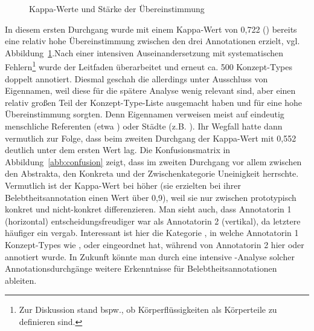 \begin{figure}
\caption {Kappa-Werte und Stärke der Übereinstimmung \parencite[576]{Artstein2008}\label{abb:kappa-skala}}
\end{figure} 

In diesem ersten Durchgang wurde mit einem Kappa-Wert von 0,722 () bereits eine relativ hohe Übereinstimmung zwischen den drei Annotationen  erzielt, vgl. Abbildung~\ref{abb:kappa-skala}.\largerpage[1.25]
Nach einer intensiven Auseinandersetzung mit systematischen Fehlern\footnote{Zur Diskussion stand bspw., ob Körperflüssigkeiten als Körperteile zu definieren sind.} wurde der Leitfaden überarbeitet und erneut ca. 500 Konzept-Types  doppelt  annotiert. Diesmal geschah die  allerdings unter Ausschluss von  Eigennamen, weil diese für die spätere Analyse wenig relevant sind, aber einen relativ großen Teil der Konzept-Type-Liste  ausgemacht haben und für eine hohe Übereinstimmung sorgten. Denn Eigennamen  verweisen meist auf eindeutig menschliche Referenten (etwa ) oder Städte (z.B. ).
Ihr Wegfall hatte dann vermutlich zur Folge, dass beim zweiten Durchgang der Kappa-Wert mit 0,552 deutlich unter dem ersten Wert lag. 
Die Konfusionsmatrix in Abbildung~\ref{abb:confusion} zeigt, dass im zweiten Durchgang vor allem zwischen den  Abstrakta, den Konkreta  und der Zwischenkategorie  Uneinigkeit herrschte. Vermutlich ist der Kappa-Wert bei \textcite{Zaenen2004} höher (sie erzielten bei ihrer Belebtheitsannotation einen Wert über 0,9), weil sie nur zwischen prototypisch konkret  und nicht-konkret differenzieren. Man sieht auch, dass Annotatorin 1 (horizontal) entscheidungsfreudiger war als Annotatorin 2 (vertikal), da letztere häufiger ein  vergab. Interessant ist hier die Kategorie , in welche Annotatorin 1 Konzept-Types  wie ,  oder  eingeordnet hat, während von Annotatorin 2 hier  oder  annotiert wurde. In Zukunft könnte man durch eine intensive -Analyse solcher Annotationsdurchgänge  weitere Erkenntnisse für Belebtheitsannotationen   ableiten.  
 
